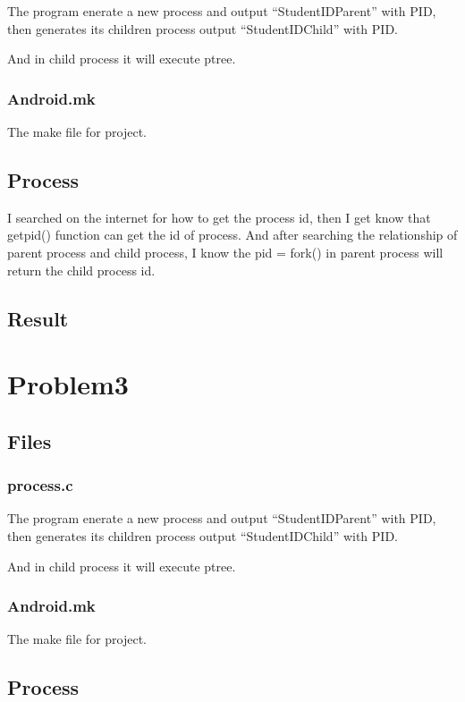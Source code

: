 \documentclass[a4paper,oneside,12pt]{article}
\begin{document}
The program enerate a new process and output “StudentIDParent” with PID, then generates its children process output “StudentIDChild” with PID.

And in child process it will execute ptree.

\subsubsection{Android.mk}

The make file for project.

\subsection{Process}

I searched on the internet for how to get the process id, then I get know that getpid() function can get the id of process. And after searching the relationship of parent process and child process, I know the pid = fork() in parent process will return the child process id.

\subsection{Result}

\section{Problem3}
\subsection{Files}
\subsubsection{process.c}

The program enerate a new process and output “StudentIDParent” with PID, then generates its children process output “StudentIDChild” with PID.

And in child process it will execute ptree.

\subsubsection{Android.mk}

The make file for project.

\subsection{Process}
\end{document}
